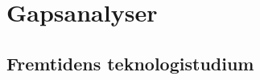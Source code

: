\documentclass{memoir}
\begin{document}

\chapter{Gapsanalyser}

\section{Fremtidens teknologistudium}








\end{document}
